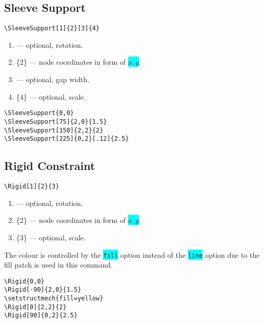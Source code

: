 \documentclass[10pt,a4paper]{article}
\newcommand*{\Highlight}[1]{\colorbox{cyan}{\color{red}\texttt{#1}}}
\begin{document}
\subsection{Sleeve Support}
\begin{Verbatim}[frame=single,label=Syntax]
\SleeveSupport[1]{2}[3]{4}
\end{Verbatim}
\begin{enumerate}
\item[][1] --- optional, rotation.
\item[]\{2\} --- node coordinates in form of \Highlight{$x,y$}.
\item[][3] --- optional, gap width.
\item[]\{4\} --- optional, scale.
\end{enumerate}
\begin{Verbatim}[frame=single,label=Example]
\SleeveSupport{0,0}
\SleeveSupport[75]{2,0}{1.5}
\SleeveSupport[150]{2,2}{2}
\SleeveSupport[225]{0,2}[.12]{2.5}
\end{Verbatim}
\begin{figure}[H]
\centering
{}
\end{figure}
\subsection{Rigid Constraint}
\begin{Verbatim}[frame=single,label=Syntax]
\Rigid[1]{2}{3}
\end{Verbatim}
\begin{enumerate}
\item[][1] --- optional, rotation.
\item[]\{2\} --- node coordinates in form of \Highlight{$x,y$}.
\item[]\{3\} --- optional, scale.
\end{enumerate}
The colour is controlled by the \Highlight{fill} option instead of the \Highlight{line} option due to the fill patch is used in this command.
\begin{Verbatim}[frame=single,label=Example]
\Rigid{0,0}
\Rigid[-90]{2,0}{1.5}
\setstructmech{fill=yellow}
\Rigid[0]{2,2}{2}
\Rigid[90]{0,2}{2.5}
\end{Verbatim}
\begin{figure}[H]
\centering
{}
\end{figure}
\end{document}
